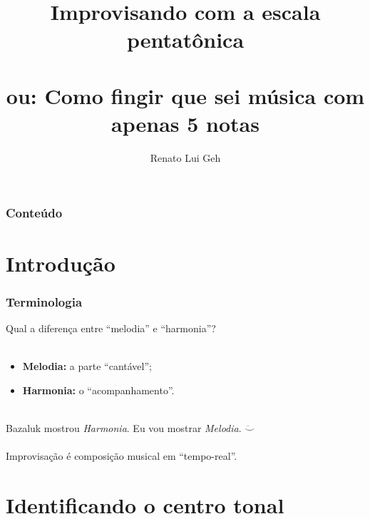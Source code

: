 \documentclass[usenames,dvipsnames]{beamer}
\title{Improvisando com a escala pentatônica\\~\\\small ou: Como fingir que sei música com apenas 5
notas}
\date{}
\author{Renato Lui Geh}
\begin{document}
\maketitle

\begin{frame}
  \frametitle{Conteúdo}
  \tableofcontents
\end{frame}

\section{Introdução}

\begin{frame}
  \frametitle{Terminologia}

  Qual a diferença entre ``melodia'' e ``harmonia''?\\~\\

  \begin{itemize}
    \item \textbf{Melodia:} a parte ``cantável'';\\
    \item \textbf{Harmonia:} o ``acompanhamento''.
  \end{itemize}~\\

  Bazaluk mostrou \emph{Harmonia}. Eu vou mostrar \emph{Melodia}. $\ddot\smile$\\~\\

  Improvisação é composição musical em ``tempo-real''.
\end{frame}

\section{Identificando o centro tonal}
\end{document}
